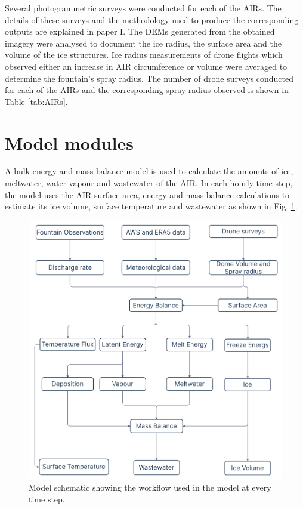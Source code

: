 Several photogrammetric surveys were conducted for each of the \ac{AIRs}. The details of these surveys and the
methodology used to produce the corresponding outputs are explained in paper I. The
\ac{DEMs} generated from the obtained imagery were analysed to document the ice radius, the surface area and the
volume of the ice structures. Ice radius measurements of drone flights which observed either an increase in AIR
circumference or volume were averaged to determine the fountain's spray radius. The number of drone surveys
conducted for each of the AIRs and the corresponding spray radius observed is shown in Table \ref{tab:AIRs}.

\section{Model modules}
\label{sec:modules}

A bulk energy and mass balance model is used to calculate the amounts of ice, meltwater, water vapour and
wastewater of the AIR. In each hourly time step, the model uses the AIR surface area, energy and mass balance
calculations to estimate its ice volume, surface temperature and wastewater as shown in Fig. \ref{fig:schema}.

\begin{figure}
	\begin{center}
		\includegraphics[width=10 cm]{figs/model_schematic.jpg}
	\end{center}
	\caption{Model schematic showing the workflow used in the model at every time step. }
	\label{fig:schema}
\end{figure}

